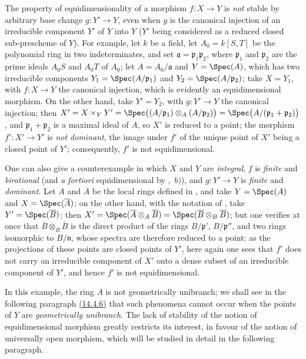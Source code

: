 \begin{remarks}[13.3.9]
\label{IV.13.3.9}
The property of equidimensionality of a morphism $f:X\to Y$ is \emph{not} stable by arbitrary base change $g:Y'\to Y$, even when $g$ is the canonical injection of an irreducible component $Y'$ of $Y$ into $Y$ ($Y'$ being
considered as a reduced closed sub-prescheme of $Y$).
For example, let $k$ be a field, let $A_0=k[S,T]$ be the polynomial ring in two indeterminates, and set $\mathfrak{a}=\mathfrak{p}_1\mathfrak{p}_2$, where $\mathfrak{p}_1$ and $\mathfrak{p}_2$ are the prime ideals $A_0S$ and $A_0T$ of $A_0$; let $A=A_0/\mathfrak{a}$ and $Y=\Spec(A)$, which has two irreducible components $Y_1=\Spec(A/\mathfrak{p}_1)$ and $Y_2=\Spec(A/\mathfrak{p}_2)$; take $X=Y_1$, with $f:X\to Y$ the canonical injection, which is evidently an equidimensional morphism.
On the other hand, take $Y'=Y_2$, with $g:Y'\to Y$ the canonical injection; then $X'=X\times_Y Y'=\Spec\bigl((A/\mathfrak{p}_1)\otimes_A(A/\mathfrak{p}_2)\bigr)=\Spec\bigl(A/(\mathfrak{p}_1+\mathfrak{p}_2)\bigr)$, and $\mathfrak{p}_1+\mathfrak{p}_2$ is a maximal ideal of $A$, so $X'$ is reduced to a point; the morphism $f':X'\to Y'$ is \emph{not dominant}, the image under $f'$ of the unique point of $X'$ being a closed point of $Y'$; consequently, $f'$ is not equidimensional.

One can also give a counterexample in which $X$ and $Y$ are \emph{integral}, $f$ is \emph{finite} and \emph{birational} (and \emph{a fortiori} equidimensional by ,~$b)$), and $g:Y'\to Y$ is \emph{finite} and \emph{dominant}.
Let $A$ and $\overline{A}$ be the local rings defined in , and take $Y=\Spec(A)$ and $X=\Spec(\overline{A})$; on the other hand, with the notation of , take $Y'=\Spec(\overline{B})$; then $X'=\Spec(\overline{A}\otimes_A\overline{B})=\Spec(\overline{B}\otimes_B\overline{B})$; but one verifies at once that $\overline{B}\otimes_B\overline{B}$ is the direct product of the rings $B/\mathfrak{p}'$, $B/\mathfrak{p}''$, and two rings isomorphic to $B/\mathfrak{n}$, whose spectra are therefore reduced to a point; as the projections of these points are closed points of $Y'$, here again one sees that $f'$ does not carry an irreducible component of $X'$ onto a dense subset of an irreducible component of $Y'$, and hence $f'$ is not equidimensional.

In this example, the ring $A$ is not geometrically unibranch; we shall see in the following paragraph {\hyperlink{ega4.c04.cor.14-4-6}{(14.4.6)}} that such phenomena cannot occur when the points of $Y$ are \emph{geometrically unibranch}.
The lack of stability of the notion of equidimensional morphism greatly restricts its interest, in favour of the notion of universally open morphism, which will be studied in detail in the following paragraph.
\end{remarks}
